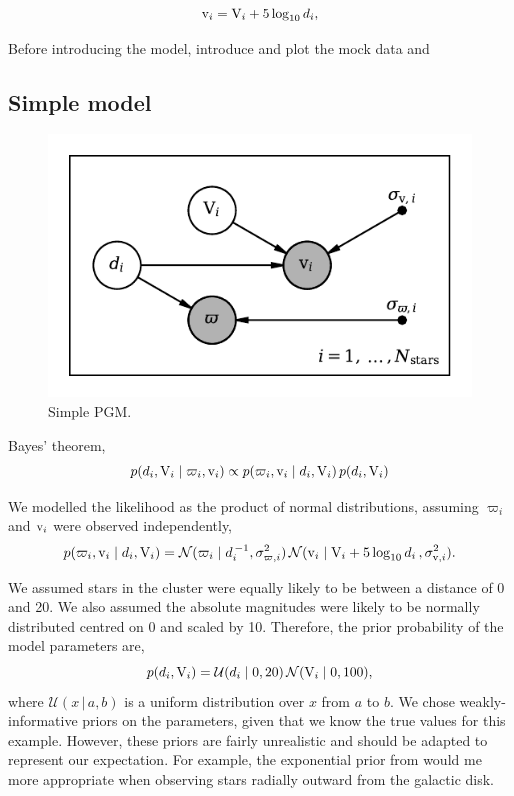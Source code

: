 %
\begin{equation}
    \mathrm{v}_i = \mathrm{V}_i + 5 \log_{10} d_i,
\end{equation}
%

Before introducing the model, introduce and plot the mock data and 

\subsection{Simple model}

\begin{figure}[tb]
    \centering
    \includegraphics{figures/simple-pgm.pdf}
    \caption{Simple PGM.}
\end{figure}

Bayes' theorem,
%
\begin{equation}
    p(d_i, \mathrm{V}_i \mid \varpi_i, \mathrm{v}_i) \propto p(\varpi_i, \mathrm{v}_i \mid d_i, \mathrm{V}_i) \, p(d_i, \mathrm{V}_i)
\end{equation}
%

We modelled the likelihood as the product of normal distributions, assuming \(\varpi_i\) and \(\mathrm{v}_i\) were observed independently,
%
\begin{equation}
    p(\varpi_i, \mathrm{v}_i \mid d_i, \mathrm{V}_i) = \mathcal{N}(\varpi_i \mid d_i^{\,-1}, \sigma_{\varpi, i}^2) \, \mathcal{N}(\mathrm{v}_i \mid \mathrm{V}_i + 5\log_{10}d_i \, , \sigma_{\mathrm{v}, i}^2).\label{eq:hbm-like}
\end{equation}
%

We assumed stars in the cluster were equally likely to be between a distance of 0 and 20. We also assumed the absolute magnitudes were likely to be normally distributed centred on 0 and scaled by 10. Therefore, the prior probability of the model parameters are,
%
\begin{equation}
    p(d_i, \mathrm{V}_i) = \mathcal{U}(d_i \mid 0, 20) \, \mathcal{N}(\mathrm{V}_i \mid 0, 100),
\end{equation}
%
where \(\mathcal{U}(x \,|\, a, b)\) is a uniform distribution over \(x\) from \(a\) to \(b\). We chose weakly-informative priors on the parameters, given that we know the true values for this example. However, these priors are fairly unrealistic and should be adapted to represent our expectation. For example, the exponential prior from \citet{Bailer-Jones.Rybizki.ea2018} would me more appropriate when observing stars radially outward from the galactic disk.

